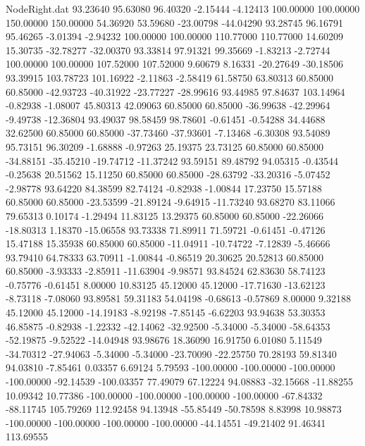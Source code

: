 \begin{filecontents}{NodeRight.dat}
  93.23640   95.63080   96.40320    -2.15444   -4.12413  100.00000  100.00000  150.00000  150.00000   54.36920   53.59680  -23.00798  -44.04290
  93.28745   96.16791   95.46265    -3.01394   -2.94232  100.00000  100.00000  110.77000  110.77000   14.60209   15.30735  -32.78277  -32.00370
  93.33814   97.91321   99.35669    -1.83213   -2.72744  100.00000  100.00000  107.52000  107.52000    9.60679    8.16331  -20.27649  -30.18506
  93.39915  103.78723  101.16922    -2.11863   -2.58419   61.58750   63.80313   60.85000   60.85000  -42.93723  -40.31922  -23.77227  -28.99616
  93.44985   97.84637  103.14964    -0.82938   -1.08007   45.80313   42.09063   60.85000   60.85000  -36.99638  -42.29964   -9.49738  -12.36804
  93.49037   98.58459   98.78601    -0.61451   -0.54288   34.44688   32.62500   60.85000   60.85000  -37.73460  -37.93601   -7.13468   -6.30308
  93.54089   95.73151   96.30209    -1.68888   -0.97263   25.19375   23.73125   60.85000   60.85000  -34.88151  -35.45210  -19.74712  -11.37242
  93.59151   89.48792   94.05315    -0.43544   -0.25638   20.51562   15.11250   60.85000   60.85000  -28.63792  -33.20316   -5.07452   -2.98778
  93.64220   84.38599   82.74124    -0.82938   -1.00844   17.23750   15.57188   60.85000   60.85000  -23.53599  -21.89124   -9.64915  -11.73240
  93.68270   83.11066   79.65313     0.10174   -1.29494   11.83125   13.29375   60.85000   60.85000  -22.26066  -18.80313    1.18370  -15.06558
  93.73338   71.89911   71.59721    -0.61451   -0.47126   15.47188   15.35938   60.85000   60.85000  -11.04911  -10.74722   -7.12839   -5.46666
  93.79410   64.78333   63.70911    -1.00844   -0.86519   20.30625   20.52813   60.85000   60.85000   -3.93333   -2.85911  -11.63904   -9.98571
  93.84524   62.83630   58.74123    -0.75776   -0.61451    8.00000   10.83125   45.12000   45.12000  -17.71630  -13.62123   -8.73118   -7.08060
  93.89581   59.31183   54.04198    -0.68613   -0.57869    8.00000    9.32188   45.12000   45.12000  -14.19183   -8.92198   -7.85145   -6.62203
  93.94638   53.30353   46.85875    -0.82938   -1.22332  -42.14062  -32.92500   -5.34000   -5.34000  -58.64353  -52.19875   -9.52522  -14.04948
  93.98676   18.36090   16.91750     6.01080    5.11549  -34.70312  -27.94063   -5.34000   -5.34000  -23.70090  -22.25750   70.28193   59.81340
  94.03810   -7.85461    0.03357     6.69124    5.79593 -100.00000 -100.00000 -100.00000 -100.00000  -92.14539 -100.03357   77.49079   67.12224
  94.08883  -32.15668  -11.88255    10.09342   10.77386 -100.00000 -100.00000 -100.00000 -100.00000  -67.84332  -88.11745  105.79269  112.92458
  94.13948  -55.85449  -50.78598     8.83998   10.98873 -100.00000 -100.00000 -100.00000 -100.00000  -44.14551  -49.21402   91.46341  113.69555

\end{filecontents}
